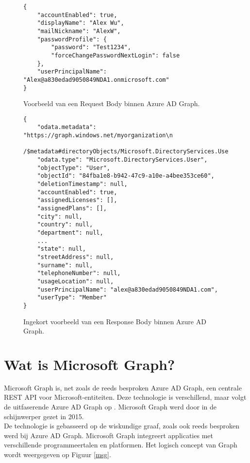 \begin{figure}[h!]
    \scriptsize
    \begin{verbatim}
{
    "accountEnabled": true,
    "displayName": "Alex Wu",
    "mailNickname": "AlexW",
    "passwordProfile": {
        "password": "Test1234",
        "forceChangePasswordNextLogin": false
    },
    "userPrincipalName": "Alex@a830edad9050849NDA1.onmicrosoft.com"
}
    \end{verbatim}
    \caption[Voorbeeld Request Body Azure AD Graph]{Voorbeeld van een Request Body binnen Azure \ac{AD} Graph.}
    \label{hreqb}
\end{figure}

\begin{figure}[h!]
    \scriptsize
    \begin{verbatim}
{
    "odata.metadata": "https://graph.windows.net/myorganization\n
    /$metadata#directoryObjects/Microsoft.DirectoryServices.User/@Element",
    "odata.type": "Microsoft.DirectoryServices.User",
    "objectType": "User",
    "objectId": "84fba1e8-b942-47c9-a10e-a4bee353ce60",
    "deletionTimestamp": null,
    "accountEnabled": true,
    "assignedLicenses": [],
    "assignedPlans": [],
    "city": null,
    "country": null,
    "department": null,
    ...
    "state": null,
    "streetAddress": null,
    "surname": null,
    "telephoneNumber": null,
    "usageLocation": null,
    "userPrincipalName": "alex@a830edad9050849NDA1.com",
    "userType": "Member"
}
    \end{verbatim}
    \caption[Voorbeeld Response Body Azure AD Graph]{Ingekort voorbeeld van een Response Body binnen Azure \ac{AD} Graph.}
    \label{hresb}
\end{figure}


\section{Wat is Microsoft Graph?}

Microsoft Graph is, net zoals de reeds besproken Azure \Ac{AD} Graph, een centrale \ac{REST} \ac{API} voor Microsoft-entiteiten. Deze technologie is verschillend, maar volgt de uitfaserende Azure \ac{AD} Graph op \autocite{Microsoft2023n}. Microsoft Graph werd door \textcite{Microsoft2015a} in de schijnwerper gezet in 2015. \\

De technologie is gebasseerd op de wiskundige graaf, zoals ook reeds besproken werd bij Azure \Ac{AD} Graph. Microsoft Graph integreert applicaties met verschillende programmeertalen en platformen. Het logisch concept van Graph wordt weergegeven op Figuur \ref{msg}.

